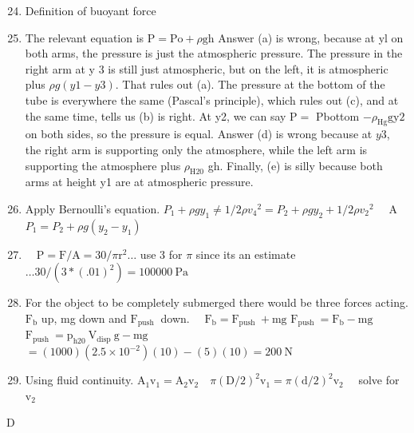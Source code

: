 \begin{enumerate}
\begin{enumerate}
  \setcounter{enumi}{23}
  \item Definition of buoyant force
  \item The relevant equation is $\mathrm{P}=\mathrm{Po}+\rho \mathrm{gh}$ Answer (a) is wrong, because at yl on both arms, the pressure is just the atmospheric pressure. The pressure in the right arm at y 3 is still just atmospheric, but on the left, it is atmospheric plus $\rho g(y 1-y 3)$. That rules out (a). The pressure at the bottom of the tube is everywhere the same (Pascal's principle), which rules out (c), and at the same time, tells us (b) is right. At y2, we can say $\mathrm{P}=$ Pbottom $-\rho_{\mathrm{Hg}} \mathrm{gy} 2$ on both sides, so the pressure is equal. Answer (d) is wrong because at $y 3$, the right arm is supporting only the atmosphere, while the left arm is supporting the atmosphere plus $\rho_{\mathrm{H} 20}$ gh. Finally, (e) is silly because both arms at height y1 are at atmospheric pressure.
  \item Apply Bernoulli's equation. $P_{1}+\rho g y_{1} \neq 1 / 2 \rho v_{4}{ }^{2}=P_{2}+\rho g y_{2}+1 / 2 \rho v_{2}{ }^{2} \quad$ A $P_{1}=P_{2}+\rho g\left(y_{2}-y_{1}\right)$
  \item $\quad \mathrm{P}=\mathrm{F} / \mathrm{A}=30 / \pi \mathrm{r}^{2} \ldots$ use 3 for $\pi$ since its an estimate $\ldots 30 /\left(3 *(.01)^{2}\right)=100000 \mathrm{~Pa}$
  \item For the object to be completely submerged there would be three forces acting. $\mathrm{F}_{\mathrm{b}}$ up, mg down and $\mathrm{F}_{\text {push }}$ down. $\quad \mathrm{F}_{\mathrm{b}}=\mathrm{F}_{\text {push }}+\mathrm{mg}$ $\mathrm{F}_{\text {push }}=\mathrm{F}_{\mathrm{b}}-\mathrm{mg}$\\
$\mathrm{F}_{\text {push }}=\mathrm{p}_{\mathrm{h} 20} \mathrm{~V}_{\text {disp }} \mathrm{g}-\mathrm{mg}$\\
$=(1000)\left(2.5 \times 10^{-2}\right)(10)-(5)(10)=200 \mathrm{~N}$
  \item Using fluid continuity. $\mathrm{A}_{1} \mathrm{v}_{1}=\mathrm{A}_{2} \mathrm{v}_{2} \quad \pi(\mathrm{D} / 2)^{2} \mathrm{v}_{1}=\pi(\mathrm{d} / 2)^{2} \mathrm{v}_{2} \quad$ solve for $\mathrm{v}_{2}$
\end{enumerate}

D


\end{enumerate}
